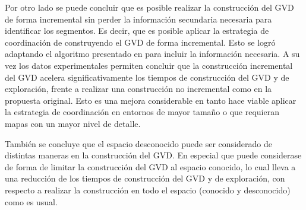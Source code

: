 Por otro lado se puede concluir que es posible realizar la construcción del GVD
de forma incremental sin perder la información secundaria necesaria para
identificar los segmentos. Es decir, que es posible aplicar la estrategia de
coordinación de \cite{wurm2008coordinated} construyendo el GVD de forma
incremental. Esto se logró adaptando el algoritmo presentado en \cite{Lau2013}
para incluir la información necesaria. A su vez los datos experimentales permiten
concluir que la construcción incremental del GVD acelera significativamente los
tiempos de construcción del GVD y de exploración, frente a realizar una
construcción no incremental como en la propuesta original. Esto es una mejora
considerable en tanto hace viable aplicar la estrategia de coordinación en
entornos de mayor tamaño o que requieran mapas con un mayor nivel de detalle.


También se concluye que el espacio desconocido puede ser considerado de
distintas maneras en la construcción del GVD. En especial que puede considerase
de forma de limitar la construcción del GVD al espacio conocido, lo cual lleva
a una reducción de los tiempos de construcción del GVD y de exploración, con
respecto a realizar la construcción en todo el espacio (conocido y desconocido)
como es usual.




